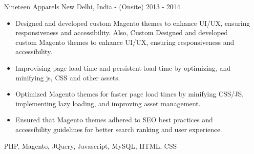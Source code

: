 \begin{projects}
    \project
    {Nineteen Apparels} {New Delhi, India - (Onsite)} {2013 - 2014}
    {}
    {\begin{itemize}
        \item Designed and developed custom Magento themes to enhance UI/UX, ensuring responsiveness and accessibility. Also, Custom Designed and developed custom Magento themes to enhance UI/UX, ensuring responsiveness and accessibility.
        \item Improvising page load time and persistent load time by optimizing, and minifying js, CSS and other assets.
        \item Optimized Magento themes for faster page load times by minifying CSS/JS, implementing lazy loading, and improving asset management.
        \item Ensured that Magento themes adhered to SEO best practices and accessibility guidelines for better search ranking and user experience.
    \end{itemize}}
    {PHP, Magento, JQuery, Javascript, MySQL, HTML, CSS}

    \newpage
    

\end{projects}
